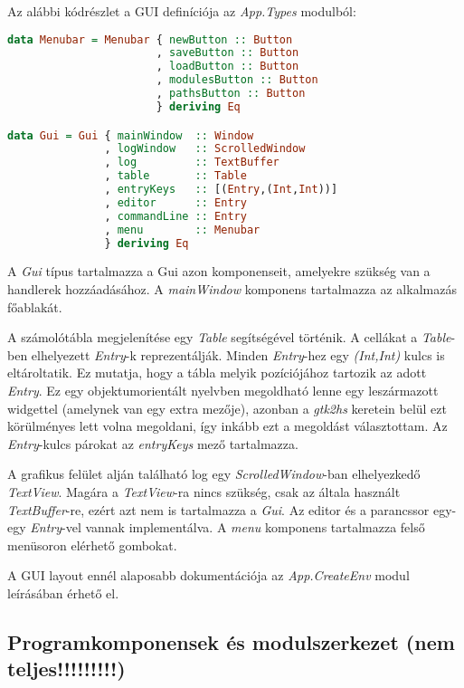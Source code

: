Az alábbi kódrészlet a GUI definíciója az \textit{App.Types} modulból:

\begin{lstlisting}[language={Haskell}]
data Menubar = Menubar { newButton :: Button
                       , saveButton :: Button
                       , loadButton :: Button
                       , modulesButton :: Button
                       , pathsButton :: Button
                       } deriving Eq

data Gui = Gui { mainWindow  :: Window
               , logWindow   :: ScrolledWindow
               , log         :: TextBuffer
               , table       :: Table
               , entryKeys   :: [(Entry,(Int,Int))]
               , editor      :: Entry
               , commandLine :: Entry
               , menu        :: Menubar
               } deriving Eq
\end{lstlisting}

A \textit{Gui} típus tartalmazza a Gui azon komponenseit, amelyekre szükség van a handlerek hozzáadásához. A \textit{mainWindow} komponens tartalmazza az alkalmazás főablakát. 

A számolótábla megjelenítése egy \textit{Table} segítségével történik. A cellákat a \textit{Table}-ben elhelyezett \textit{Entry}-k reprezentálják. Minden \textit{Entry}-hez egy \textit{(Int,Int)} kulcs is eltároltatik. Ez mutatja, hogy a tábla melyik pozíciójához tartozik az adott \textit{Entry}. Ez egy objektumorientált nyelvben megoldható lenne egy leszármazott widgettel (amelynek van egy extra mezője), azonban a \textit{gtk2hs} keretein belül ezt körülményes lett volna megoldani, így inkább ezt a megoldást választottam. Az \textit{Entry}-kulcs párokat az \textit{entryKeys} mező tartalmazza.

A grafikus felület alján található log egy \textit{ScrolledWindow}-ban elhelyezkedő \textit{TextView}. Magára a \textit{TextView}-ra nincs szükség, csak az általa használt \textit{TextBuffer}-re, ezért azt nem is tartalmazza a \textit{Gui}. Az editor és a parancssor egy-egy \textit{Entry}-vel vannak implementálva. A \textit{menu} komponens tartalmazza felső menüsoron elérhető gombokat. 

A GUI layout ennél alaposabb dokumentációja az \textit{App.CreateEnv} modul leírásában érhető el. 

\subsection{Programkomponensek és modulszerkezet (nem teljes!!!!!!!!!)}

